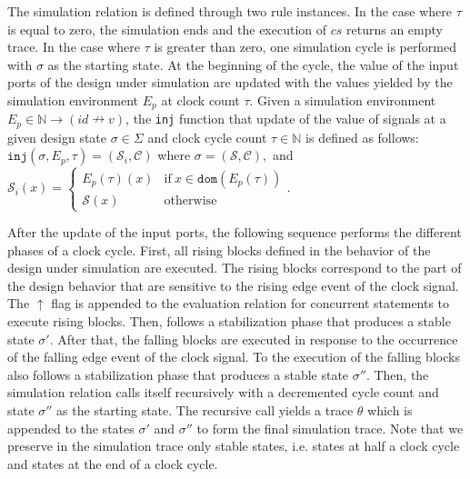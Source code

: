 The \hvhdl{} simulation relation is defined through two rule
instances.  In the case where $\tau$ is equal to zero, the simulation
ends and the execution of $cs$ returns an empty trace. In the case
where $\tau$ is greater than zero, one simulation cycle is performed
with $\sigma$ as the starting state. At the beginning of the cycle,
the value of the input ports of the design under simulation are
updated with the values yielded by the simulation environment $E_p$ at
clock count $\tau$. Given a simulation environment
$E_p\in\mathbb{N}\rightarrow(id\nrightarrow{}v)$, the \texttt{inj}
function that update of the value of signals at a given design state
$\sigma\in\Sigma$ and clock cycle count $\tau\in{}\mathbb{N}$ is
defined as follows:
$\mathtt{inj}(\sigma,E_p,\tau)=(\mathcal{S}_i,\mathcal{C})$ where
$\sigma=(\mathcal{S},\mathcal{C}), $ and $\mathcal{S}_i(x)=
\begin{cases}
  E_p(\tau)(x) & \mathrm{if}~x\in\mathtt{dom}(E_p(\tau)) \\
  \mathcal{S}(x) & \mathrm{otherwise}
\end{cases}$.

After the update of the input ports, the following sequence performs
the different phases of a clock cycle. First, all rising blocks
defined in the behavior of the design under simulation are
executed. The rising blocks correspond to the part of the design
behavior that are sensitive to the rising edge event of the clock
signal. %
The $\uparrow$ flag is appended to the evaluation relation for
concurrent statements to execute rising blocks. Then, follows a
stabilization phase that produces a stable state $\sigma'$. After
that, the falling blocks are executed in response to the occurrence of
the falling edge event of the clock signal. To the execution of the
falling blocks also follows a stabilization phase that produces a
stable state $\sigma''$.  Then, the \hvhdl{} simulation relation calls
itself recursively with a decremented cycle count and state $\sigma''$
as the starting state. The recursive call yields a trace $\theta$
which is appended to the states $\sigma'$ and $\sigma''$ to form the
final simulation trace. Note that we preserve in the simulation trace
only stable states, i.e. states at half a clock cycle and states at
the end of a clock cycle.

